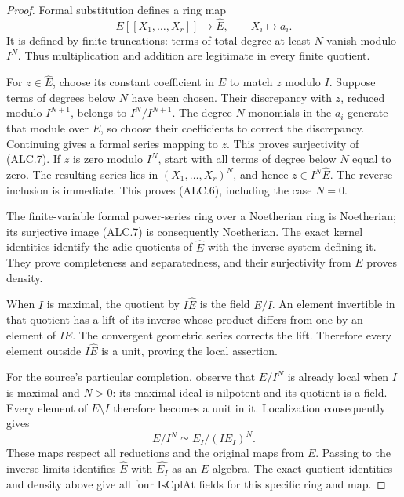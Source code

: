 \documentclass[11pt,a4paper]{article}
\numberwithin{equation}{section}
\theoremstyle{remark}\newtheorem{remark}[theorem]{Remark}
\begin{document}
\begin{proof}
Formal substitution defines a ring map
\[
 E[[X_1,\ldots,X_r]]\longrightarrow\widehat E,
                \qquad X_i\longmapsto a_i.           \tag{ALC.7}
\]
It is defined by finite truncations: terms of total degree at
least \(N\) vanish modulo \(I^N\).  Thus multiplication
and addition are legitimate in every finite quotient.

For \(z\in\widehat E\), choose its constant coefficient
in \(E\) to match \(z\) modulo \(I\).  Suppose terms of
degrees below \(N\) have been chosen.  Their discrepancy
with \(z\), reduced modulo \(I^{N+1}\), belongs to
\(I^N/I^{N+1}\).  The degree-\(N\) monomials in the
\(a_i\) generate that module over \(E\), so choose their
coefficients to correct the discrepancy.  Continuing gives a
formal series mapping to \(z\).  This proves surjectivity of
(ALC.7).  If \(z\) is zero modulo \(I^N\), start with all
terms of degree below \(N\) equal to zero.  The resulting
series lies in \((X_1,\ldots,X_r)^N\), and hence
\(z\in I^N\widehat E\).  The reverse inclusion is immediate.
This proves (ALC.6), including the case \(N=0\).

The finite-variable formal power-series ring over a Noetherian
ring is Noetherian; its surjective image (ALC.7) is consequently
Noetherian.  The exact kernel identities identify the adic
quotients of \(\widehat E\) with the inverse system defining
it.  They prove completeness and separatedness, and their
surjectivity from \(E\) proves density.

When \(I\) is maximal, the quotient by \(I\widehat E\) is
the field \(E/I\).  An element invertible in that quotient
has a lift of its inverse whose product differs from one by
an element of \(I\widehat E\).  The convergent geometric
series corrects the lift.  Therefore every element outside
\(I\widehat E\) is a unit, proving the local assertion.

For the source's particular completion, observe that
\(E/I^N\) is already local when \(I\) is maximal and
\(N>0\): its maximal ideal is nilpotent and its quotient
is a field.  Every element of \(E\setminus I\) therefore
becomes a unit in it.  Localization consequently gives
\[
        E/I^N\simeq E_I/(IE_I)^N.
\]
These maps respect all reductions and the original maps
from \(E\).  Passing to the inverse limits identifies
\(\widehat E\) with \(\widehat{E_I}\) as an
\(E\)-algebra.  The exact quotient identities and density
above give all four \(\mathrm{IsCplAt}\) fields for this
specific ring and map.
\end{proof}
\end{document}
